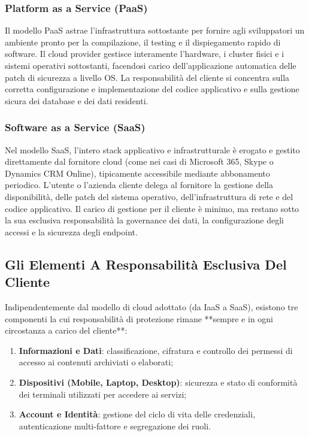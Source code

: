 \documentclass[11pt, a4paper]{article}
\begin{document}
\subsubsection{Platform as a Service (PaaS)}
Il modello PaaS astrae l'infrastruttura sottostante per fornire agli sviluppatori un ambiente pronto per la compilazione, il testing e il dispiegamento rapido di software. Il cloud provider gestisce interamente l'hardware, i cluster fisici e i sistemi operativi sottostanti, facendosi carico dell'applicazione automatica delle patch di sicurezza a livello OS. La responsabilità del cliente si concentra sulla corretta configurazione e implementazione del codice applicativo e sulla gestione sicura dei database e dei dati residenti.

\subsubsection{Software as a Service (SaaS)}
Nel modello SaaS, l'intero stack applicativo e infrastrutturale è erogato e gestito direttamente dal fornitore cloud (come nei casi di Microsoft 365, Skype o Dynamics CRM Online), tipicamente accessibile mediante abbonamento periodico. L'utente o l'azienda cliente delega al fornitore la gestione della disponibilità, delle patch del sistema operativo, dell'infrastruttura di rete e del codice applicativo. Il carico di gestione per il cliente è minimo, ma restano sotto la sua esclusiva responsabilità la governance dei dati, la configurazione degli accessi e la sicurezza degli endpoint.

\subsection{Gli Elementi A Responsabilità Esclusiva Del Cliente}

Indipendentemente dal modello di cloud adottato (da IaaS a SaaS), esistono tre componenti la cui responsabilità di protezione rimane **sempre e in ogni circostanza a carico del cliente**:
\begin{enumerate}[noitemsep]
    \item \textbf{Informazioni e Dati}: classificazione, cifratura e controllo dei permessi di accesso ai contenuti archiviati o elaborati;
    \item \textbf{Dispositivi (Mobile, Laptop, Desktop)}: sicurezza e stato di conformità dei terminali utilizzati per accedere ai servizi;
    \item \textbf{Account e Identità}: gestione del ciclo di vita delle credenziali, autenticazione multi-fattore e segregazione dei ruoli.
\end{enumerate}
\end{document}
